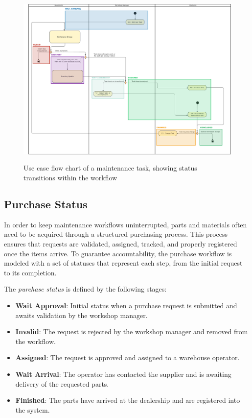 \begin{figure}[h]
  \caption{Use case flow chart of a maintenance task, showing status transitions within the workflow}
  \centering
  \includegraphics[width=\textwidth]{figs/Status/MaintenanceTask/UseCaseStatus}
  \label{fig:maintenanceTaskUseCase}
\end{figure}

\subsection{Purchase Status} 

In order to keep maintenance workflows uninterrupted, parts and materials often need to be acquired through a structured purchasing process. This process ensures that requests are validated, assigned, tracked, and properly registered once the items arrive. To guarantee accountability, the purchase workflow is modeled with a set of statuses that represent each step, from the initial request to its completion.

The \textit{purchase status} is defined by the following stages:
\begin{itemize}
\item \textbf{Wait Approval}: Initial status when a purchase request is submitted and awaits validation by the workshop manager.
\item \textbf{Invalid}: The request is rejected by the workshop manager and removed from the workflow.
\item \textbf{Assigned}: The request is approved and assigned to a warehouse operator.
\item \textbf{Wait Arrival}: The operator has contacted the supplier and is awaiting delivery of the requested parts.
\item \textbf{Finished}: The parts have arrived at the dealership and are registered into the system.
\end{itemize}

